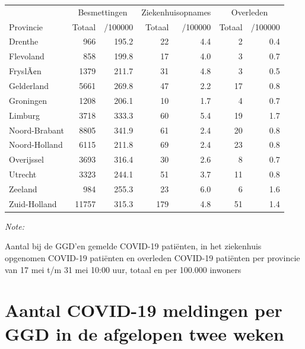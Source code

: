 \documentclass[
  english,
  man,floatsintext]{apa6}
\begin{document}
\begin{table}
\centering
\begin{threeparttable}
\begin{tabular}{lrrrrrr}
\toprule
\multicolumn{1}{c}{ } & \multicolumn{2}{c}{Besmettingen} & \multicolumn{2}{c}{Ziekenhuisopnames} & \multicolumn{2}{c}{Overleden} \\
\cmidrule(l{3pt}r{3pt}){2-3} \cmidrule(l{3pt}r{3pt}){4-5} \cmidrule(l{3pt}r{3pt}){6-7}
Provincie & Totaal & /100000 & Totaal & /100000 & Totaal & /100000\\
\midrule
Drenthe & 966 & 195.2 & 22 & 4.4 & 2 & 0.4\\
Flevoland & 858 & 199.8 & 17 & 4.0 & 3 & 0.7\\
FryslÃ¢n & 1379 & 211.7 & 31 & 4.8 & 3 & 0.5\\
Gelderland & 5661 & 269.8 & 47 & 2.2 & 17 & 0.8\\
Groningen & 1208 & 206.1 & 10 & 1.7 & 4 & 0.7\\
Limburg & 3718 & 333.3 & 60 & 5.4 & 19 & 1.7\\
Noord-Brabant & 8805 & 341.9 & 61 & 2.4 & 20 & 0.8\\
Noord-Holland & 6115 & 211.8 & 69 & 2.4 & 23 & 0.8\\
Overijssel & 3693 & 316.4 & 30 & 2.6 & 8 & 0.7\\
Utrecht & 3323 & 244.1 & 51 & 3.7 & 11 & 0.8\\
Zeeland & 984 & 255.3 & 23 & 6.0 & 6 & 1.6\\
Zuid-Holland & 11757 & 315.3 & 179 & 4.8 & 51 & 1.4\\
\bottomrule
\end{tabular}
\begin{tablenotes}
\item \textit{Note: } 
\item Aantal bij de GGD’en gemelde COVID-19 patiënten, in het ziekenhuis opgenomen COVID-19 patiënten en overleden COVID-19 patiënten per provincie van 17 mei t/m 31 mei 10:00 uur, totaal en per 100.000 inwoners
\end{tablenotes}
\end{threeparttable}
\end{table}

\newpage

\hypertarget{aantal-covid-19-meldingen-per-ggd-in-de-afgelopen-twee-weken}{%
\section{Aantal COVID-19 meldingen per GGD in de afgelopen twee weken}\label{aantal-covid-19-meldingen-per-ggd-in-de-afgelopen-twee-weken}}
\end{document}
